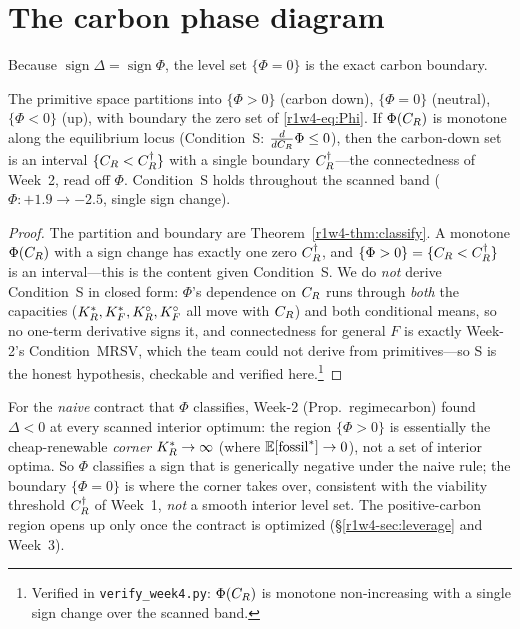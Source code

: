 \section{The carbon phase diagram}\label{r1w4-sec:phase}

Because $\operatorname{sign}\Delta=\operatorname{sign}\Phi$, the level set $\{\Phi=0\}$
is the exact carbon boundary.

\begin{theorem}\label{r1w4-prop:phase}
The primitive space partitions into $\{\Phi>0\}$ (carbon down), $\{\Phi=0\}$ (neutral),
$\{\Phi<0\}$ (up), with boundary the zero set of \eqref{r1w4-eq:Phi}. If $\Phi(C_R)$ is
monotone along the equilibrium locus (Condition~\textup{S}: $\tfrac{d}{dC_R}\Phi\le0$),
then the carbon-down set is an interval $\{C_R<C_R^{\dagger}\}$ with a single boundary
$C_R^{\dagger}$---the connectedness of Week~2, read off $\Phi$. Condition~\textup{S} holds
throughout the scanned band ($\Phi:{+}1.9\to{-}2.5$, single sign change).
\end{theorem}

\begin{proof}
The partition and boundary are Theorem~\ref{r1w4-thm:classify}. A monotone $\Phi(C_R)$ with a
sign change has exactly one zero $C_R^{\dagger}$, and $\{\Phi>0\}=\{C_R<C_R^{\dagger}\}$ is
an interval---this is the content given Condition~S. We do \emph{not} derive Condition~S
in closed form: $\Phi$'s dependence on $C_R$ runs through \emph{both} the capacities
($K_R^{*},K_F^{*},K_R^{\circ},K_F^{\circ}$ all move with $C_R$) and both conditional means, so no one-term
derivative signs it, and connectedness for general $F$ is exactly Week-2's Condition~MRSV,
which the team could not derive from primitives---so S is the honest hypothesis, checkable
and verified here.\footnote{Verified in \texttt{verify\_week4.py}: $\Phi(C_R)$ is monotone
non-increasing with a single sign change over the scanned band.}
\end{proof}

\begin{remark}
For the \emph{naive} contract that $\Phi$ classifies, Week-2 (Prop.~regimecarbon) found
$\Delta<0$ at every scanned interior optimum: the region $\{\Phi>0\}$ is essentially the
cheap-renewable \emph{corner} $K_R^{*}\to\infty$ (where $\mathbb{E}[\mathrm{fossil}^{*}]\to0$), not a set of
interior optima. So $\Phi$ classifies a sign that is generically negative under the naive
rule; the boundary $\{\Phi=0\}$ is where the corner takes over, consistent with the
viability threshold $C_R^{\dagger}$ of Week~1, \emph{not} a smooth interior level set. The
positive-carbon region opens up only once the contract is optimized (\S\ref{r1w4-sec:leverage}
and Week~3).
\end{remark}

